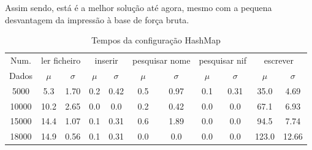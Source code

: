 \documentclass[a5paper,twocolumn, 11pt]{article}
\begin{document}
Assim sendo, está é a melhor solução até agora, mesmo com a pequena desvantagem da impressão à base de força bruta.
\clearpage
\onecolumn
    \begin{table}[h!b!t!]
    \begin{center}
    \caption{Tempos da configuração HashMap}
\begin{tabular}{ | *{11}{c|} }
\hline
    Num. & \multicolumn{2}{|c|}{ler ficheiro} & \multicolumn{2}{|c|}{inserir} & \multicolumn{2}{|c|}{pesquisar nome} & \multicolumn{2}{|c|}{pesquisar nif} & \multicolumn{2}{|c|}{escrever}\\ %
    
    Dados & $\mu$ & $\sigma$ & $\mu$ & $\sigma$ & $\mu$ & $\sigma$ & $\mu$ & $\sigma$ & $\mu$ & $\sigma$\\ \hline
    5000 & 5.3 & 1.70 & 0.2 & 0.42 & 0.5 & 0.97 & 0.1 & 0.31 & 35.0 & 4.69\\ \hline
    10000 & 10.2 & 2.65 & 0.0 & 0.0 & 0.2 & 0.42 & 0.0 & 0.0 & 67.1 & 6.93\\ \hline
    15000 & 14.4 & 1.07 & 0.1 & 0.31 & 0.6 & 1.89 & 0.0 & 0.0 & 94.5 & 7.74\\ \hline
    18000 & 14.9 & 0.56 & 0.1 & 0.31 & 0.0 & 0.0 & 0.0 & 0.0 & 123.0 & 12.66\\ \hline
\end{tabular}
\end{center}
\end{table}
\end{document}
